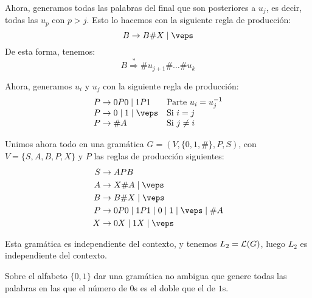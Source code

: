 \begin{ejercicio}
\begin{enumerate}
        Ahora, generamos todas las palabras del final que son posteriores a $u_j$, es decir, todas las $u_p$ con $p>j$. Esto lo hacemos con la siguiente regla de producción:
        \begin{equation*}
            B \to B\#X\mid \veps
        \end{equation*}
        De esta forma, tenemos:
        \begin{equation*}
            B \stackrel{\ast}{\Longrightarrow} \#u_{j+1}\#\dots\#u_k
        \end{equation*}
    
        Ahora, generamos $u_i$ y $u_j$ con la siguiente regla de producción:
        \begin{equation*}
            \begin{array}{ll}
                P\to 0P0\mid 1P1  & \text{Parte }u_i=u_j^{-1}\\
                P \to 0\mid 1 \mid \veps    & \text{Si }i=j\\
                P \to \# A & \text{Si }j\neq i
            \end{array}
        \end{equation*}
        
        Unimos ahora todo en una gramática $G=(V,\{0,1,\#\},P,S)$, con $V=\{S,A,B,P,X\}$ y $P$ las reglas de producción siguientes:
        \begin{equation*}
            \begin{aligned}
                S &\to APB\\
                A &\to X\#A \mid \veps\\
                B &\to B\#X\mid \veps\\
                P &\to 0P0\mid 1P1 \mid 0\mid 1 \mid \veps \mid \# A\\
                X &\to 0X \mid 1X \mid \veps
            \end{aligned}
        \end{equation*}
    
        Esta gramática es independiente del contexto, y tenemos $L_2=\mathcal{L}(G)$, luego $L_2$ es independiente del contexto.
    \end{enumerate}
\end{ejercicio}

\begin{ejercicio}\label{ej:1.4.17}
    Sobre el alfabeto $\{ 0, 1 \}$ dar una gramática no ambigua que genere todas las palabras en las que el número de $0$s es el doble que el de $1$s.
\end{ejercicio}

